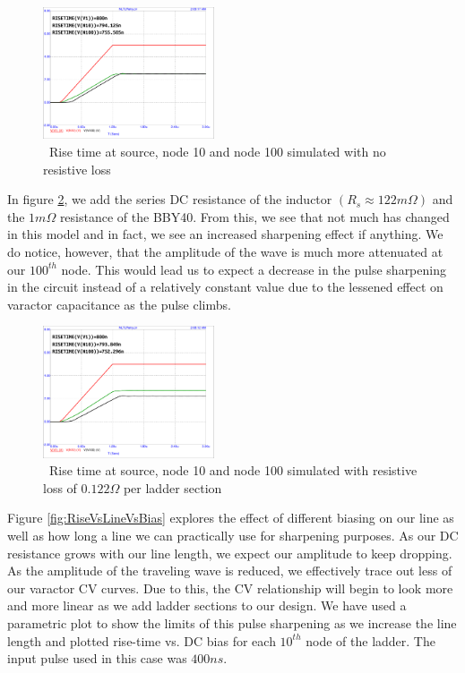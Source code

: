 \documentclass[journal]{IEEEtran} \usepackage[english]{babel}
\begin{document}
\begin{figure}[htb]
\centering
\includegraphics[width=0.45\textwidth,page = 1]{risetimeGuessNOLoss.pdf}
\caption{\ Rise time at source, node 10 and node 100 simulated with no resistive loss
}\label{fig:riseNoLoss}
\end{figure}

In figure \ref{fig:riseWithLoss}, we add the series DC resistance of the
inductor $(R_s \approx 122m\Omega)$ and the $1m\Omega$ resistance of the BBY40. 
From this, we see that not much has changed in this model and in fact, we see an
increased sharpening effect if anything. We do notice, however, that the
amplitude of the wave is much more attenuated at our $100^{th}$ node. This would
lead us to expect a decrease in the pulse sharpening in the circuit instead of a
relatively constant value due to the lessened effect on varactor capacitance as
the pulse climbs.

\begin{figure}[htb]
\centering
\includegraphics[width=0.45\textwidth,page = 1]{risetimeGuessWLoss.pdf}
\caption{\ Rise time at source, node 10 and node 100 simulated with resistive loss of $0.122\Omega$ per ladder section 
}\label{fig:riseWithLoss}
\end{figure}

 
 Figure \ref{fig:RiseVsLineVsBias} explores the effect of different biasing on our line as well as how long a line we can practically use for sharpening purposes. As our DC resistance grows with our line length, we expect our amplitude to keep dropping. As the amplitude of the traveling wave is reduced,
 we effectively trace out less of our varactor CV curves. Due to this, the CV
 relationship will begin to look more and more linear as we add ladder sections to our design. We have used a parametric plot to show the limits of this pulse sharpening as we increase the line length and plotted rise-time vs. DC bias for each $10^{th}$ node of the ladder. The input pulse used in this case was
 $400ns$.
\end{document}
